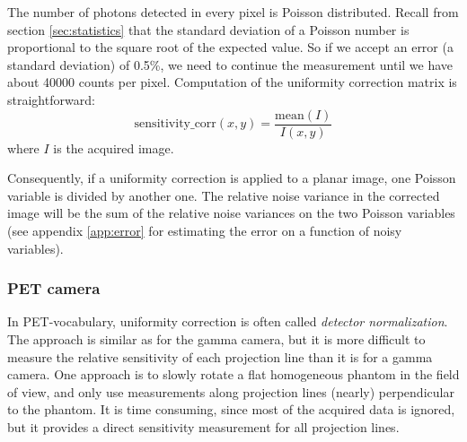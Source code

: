The number of photons detected in every pixel is Poisson distributed. Recall
from section \ref{sec:statistics} that the standard deviation of a Poisson
number is proportional to the square root of the expected value. So if we
accept an error (a standard deviation) of 0.5\%, we need to continue the
measurement until we have about 40000 counts per pixel. Computation of the
uniformity correction matrix is straightforward:
\begin{equation}
  \mbox{sensitivity\_corr}(x,y) = \frac{\mbox{mean}(I)}{I(x,y)}
\end{equation}
where $I$ is the acquired image.

Consequently, if a uniformity correction is applied to a planar image, one
Poisson variable is divided by another one. The relative noise variance in
the corrected image will be the sum of the relative noise variances on the
two Poisson variables (see appendix \ref{app:error} for estimating the error
on a function of noisy variables).

\subsubsection{PET camera \label{sec:normalization1}}
In PET-vocabulary, uniformity correction is often called {\em detector
normalization}. The approach is similar as for the gamma camera, but
it is more difficult to measure the relative sensitivity of each
projection line than it is for a gamma camera.  One approach is to
slowly rotate a flat homogeneous phantom in the field of view, and
only use measurements along projection lines (nearly) perpendicular to
the phantom. It is time consuming, since most of the acquired data is
ignored, but it provides a direct sensitivity measurement for all
projection lines.

